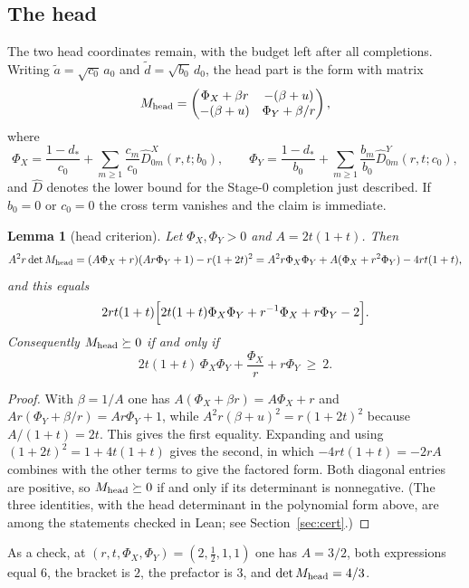 \documentclass[10pt]{article}
\newtheorem{lemma}[theorem]{Lemma}
\theoremstyle{remark}
\newcommand{\dstar}{d_{*}}
\begin{document}
\subsection{The head}

The two head coordinates remain, with the budget left after all completions. Writing $\tilde a=\sqrt{c_0}\,a_0$ and $\tilde d=\sqrt{b_0}\,d_0$, the head part is the form with matrix
\[
M_{\rm head}=\begin{pmatrix}\Phi_X+\beta r&-(\beta+u)\\-(\beta+u)&\Phi_Y+\beta/r\end{pmatrix},
\]
where
\[
\Phi_X=\frac{1-\dstar}{c_0}+\sum_{m\ge1}\frac{c_m}{c_0}\hat D^{X}_{0m}(r,t;b_0),\qquad
\Phi_Y=\frac{1-\dstar}{b_0}+\sum_{m\ge1}\frac{b_m}{b_0}\hat D^{Y}_{0m}(r,t;c_0),
\]
and $\hat D$ denotes the lower bound for the Stage-0 completion just described. If $b_0=0$ or $c_0=0$ the cross term vanishes and the claim is immediate.

\begin{lemma}[head criterion]\label{lem:head}
Let $\Phi_X,\Phi_Y>0$ and $A=2t(1+t)$. Then
\[
A^2r\det M_{\rm head}=(A\Phi_X+r)(Ar\Phi_Y+1)-r(1+2t)^2=A^2r\Phi_X\Phi_Y+A(\Phi_X+r^2\Phi_Y)-4rt(1+t),
\]
and this equals
\[
2rt(1+t)\Bigl[2t(1+t)\Phi_X\Phi_Y+r^{-1}\Phi_X+r\Phi_Y-2\Bigr].
\]
Consequently $M_{\rm head}\succeq0$ if and only if
\begin{equation}\label{eq:det_head}
2t(1+t)\,\Phi_X\Phi_Y+\frac{\Phi_X}{r}+r\Phi_Y\ \ge\ 2 .
\end{equation}
\end{lemma}

\begin{proof}
With $\beta=1/A$ one has $A(\Phi_X+\beta r)=A\Phi_X+r$ and $Ar(\Phi_Y+\beta/r)=Ar\Phi_Y+1$, while $A^2r(\beta+u)^2=r(1+2t)^2$ because $A/(1+t)=2t$. This gives the first equality. Expanding and using $(1+2t)^2=1+4t(1+t)$ gives the second, in which $-4rt(1+t)=-2rA$ combines with the other terms to give the factored form. Both diagonal entries are positive, so $M_{\rm head}\succeq0$ if and only if its determinant is nonnegative. (The three identities, with the head determinant in the polynomial form above, are among the statements checked in Lean; see Section~\ref{sec:cert}.)
\end{proof}

As a check, at $(r,t,\Phi_X,\Phi_Y)=(2,\tfrac12,1,1)$ one has $A=3/2$, both expressions equal $6$, the bracket is $2$, the prefactor is $3$, and $\det M_{\rm head}=4/3$.
\end{document}
